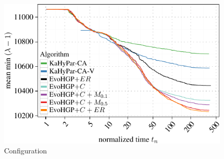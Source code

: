 \documentclass[11pt]{llncs}
\newenvironment{knitrout}{}{} %
\begin{document}
\begin{figure}
\centering
\begin{knitrout}
\color{fgcolor}

{\centering \includegraphics[width=.5\textwidth]{./algo_conf-1} 

}



\end{knitrout}
\caption{Configuration}\label{fig:config}
\end{figure}

 
\end{document}
